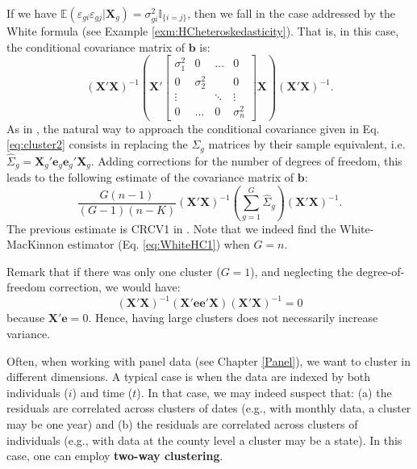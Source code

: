 \documentclass[
  12pt,
]{book}
\theoremstyle{definition}
\theoremstyle{definition}
\theoremstyle{definition}
\theoremstyle{definition}
\theoremstyle{remark}
\begin{document}
If we have \(\mathbb{E}(\varepsilon_{gi} \varepsilon_{gj}|\mathbf{X}_g)=\sigma_{gi}^2\mathbb{I}_{\{i=j\}}\), then we fall in the case addressed by the White formula (see Example \ref{exm:HCheteroskedasticity}). That is, in this case, the conditional covariance matrix of \(\mathbf{b}\) is:
\[
\left(\mathbf{X}'\mathbf{X}\right)^{-1}\left(\mathbf{X}'\left[  \begin{array}{cccc}
\sigma_1^2 & 0 & \dots & 0 \\
0 & \sigma_2^2 &  & 0 \\
\vdots && \ddots& \vdots \\
0 & \dots & 0 & \sigma_n^2
\end{array} \right]\mathbf{X}\right)\left(\mathbf{X}'\mathbf{X}\right)^{-1}.
\]
As in \citet{White_1980}, the natural way to approach the conditional covariance given in Eq. \eqref{eq:cluster2} consists in replacing the \(\Sigma_g\) matrices by their sample equivalent, i.e.~\(\widehat{\Sigma}_g=\mathbf{X}_g'\mathbf{e}_g\mathbf{e}_g'\mathbf{X}_g\). Adding corrections for the number of degrees of freedom, this leads to the following estimate of the covariance matrix of \(\mathbf{b}\):
\begin{equation}
\frac{G(n-1)}{(G-1)(n-K)}\left(\mathbf{X}'\mathbf{X}\right)^{-1}\left(\sum_{g=1}^G\widehat{\Sigma}_g\right) \left(\mathbf{X}'\mathbf{X}\right)^{-1}. \label{eq:AsymptCL}
\end{equation}
The previous estimate is CRCV1 in \citet{MACKINNON2022}. Note that we indeed find the White-MacKinnon estimator (Eq. \eqref{eq:WhiteHC1}) when \(G=n\).

Remark that if there was only one cluster (\(G=1\)), and neglecting the degree-of-freedom correction, we would have:
\[
\left(\mathbf{X}'\mathbf{X}\right)^{-1}\left(\mathbf{X}'\mathbf{e}\mathbf{e}'\mathbf{X}\right) \left(\mathbf{X}'\mathbf{X}\right)^{-1} = 0
\]
because \(\mathbf{X}'\mathbf{e}=0\). Hence, having large clusters does not necessarily increase variance.

Often, when working with panel data (see Chapter \ref{Panel}), we want to cluster in different dimensions. A typical case is when the data are indexed by both individuals (\(i\)) and time (\(t\)). In that case, we may indeed suspect that: (a) the residuals are correlated across clusters of dates (e.g., with monthly data, a cluster may be one year) and (b) the residuals are correlated across clusters of individuals (e.g., with data at the county level a cluster may be a state). In this case, one can employ \textbf{two-way clustering}.
\end{document}
